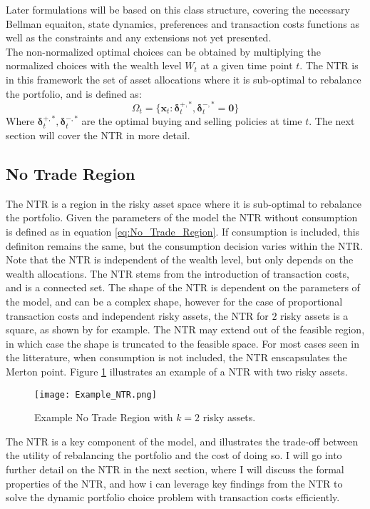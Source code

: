 \documentclass[11pt]{article}
\begin{document}
Later formulations will be based on this class structure, covering the necessary Bellman equaiton, state dynamics, preferences and transaction costs functions as well as the constraints
and any extensions not yet presented.\\
The non-normalized optimal choices can be obtained by multiplying the normalized choices with the wealth level $W_t$ at a given time point $t$.
The \ac{NTR} is in this framework the set of asset allocations where it is sub-optimal to rebalance the portfolio, and is defined as:
\begin{equation}
  \label{eq:No_Trade_Region}
  \Omega_t = \{ \mathbf{x}_{t} : \boldsymbol{\delta}^{+,*}_t , \boldsymbol{\delta}^{-,*}_t = \mathbf{0} \}
\end{equation}
Where $\boldsymbol{\delta}^{+,*}_t , \boldsymbol{\delta}^{-,*}_t$ are the optimal buying and selling policies at time $t$. 
The next section will cover the \ac{NTR} in more detail.

\subsection{No Trade Region} \label{Subsection: No-trade-region}
The \ac{NTR} is a region in the risky asset space where
it is sub-optimal to rebalance the portfolio.
Given the parameters of the model the \ac{NTR} without consumption is defined as in equation \eqref{eq:No_Trade_Region}.
If consumption is included, this definiton remains the same, but the consumption decision varies within the \ac{NTR}.
Note that the \ac{NTR} is independent of the wealth level, but only depends on the wealth allocations.
The \ac{NTR} stems from the introduction of transaction costs, and is a connected set.
The shape of the \ac{NTR} is dependent on the parameters of the model, and can be a complex shape,
however for the case of proportional transaction costs and independent risky assets, the \ac{NTR} for $2$ risky assets
is a square, as shown by \textcite{Dybvig2020} for example. 
The NTR may extend out of the feasible region, in which case the shape is truncated to the feasible space.
For most cases seen in the litterature, when consumption is not included, the \ac{NTR} enscapsulates the Merton point.
Figure \ref{fig: NTR_Example} illustrates an example of a \ac{NTR} with two risky assets.
\begin{figure}[h!]
  \begin{center}
  \caption{Example No Trade Region with $k=2$ risky assets.} 
  \label{fig: NTR_Example}
  \texttt{[image: Example\_NTR.png]}
  \end{center}
\end{figure}
The \ac{NTR} is a key component of the model, and illustrates the trade-off between the utility of rebalancing the portfolio and the cost of doing so.
I will go into further detail on the \ac{NTR} in the next section, where I will discuss the formal properties of the \ac{NTR},
and how i can leverage key findings from the \ac{NTR} to solve the dynamic portfolio choice problem with transaction costs efficiently.
\end{document}
